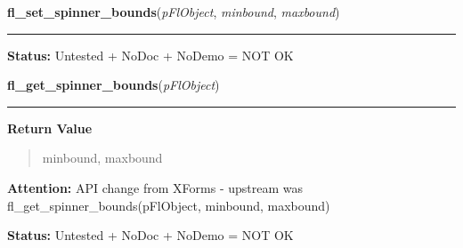     \label{xformslib:flspinner:fl_set_spinner_bounds}

    \vspace{0.5ex}

\hspace{.8\funcindent}\begin{boxedminipage}{\funcwidth}

    \raggedright \textbf{fl\_set\_spinner\_bounds}(\textit{pFlObject}, \textit{minbound}, \textit{maxbound})

    \vspace{-1.5ex}

    \rule{\textwidth}{0.5\fboxrule}
\setlength{\parskip}{2ex}
\setlength{\parskip}{1ex}
\textbf{Status:} Untested + NoDoc + NoDemo = NOT OK



    \end{boxedminipage}

    \label{xformslib:flspinner:fl_get_spinner_bounds}

    \vspace{0.5ex}

\hspace{.8\funcindent}\begin{boxedminipage}{\funcwidth}

    \raggedright \textbf{fl\_get\_spinner\_bounds}(\textit{pFlObject})

    \vspace{-1.5ex}

    \rule{\textwidth}{0.5\fboxrule}
\setlength{\parskip}{2ex}
\setlength{\parskip}{1ex}
      \textbf{Return Value}
    \vspace{-1ex}

      \begin{quote}
      minbound, maxbound

      \end{quote}

\textbf{Attention:} API change from XForms - upstream was fl\_get\_spinner\_bounds(pFlObject, 
minbound, maxbound)



\textbf{Status:} Untested + NoDoc + NoDemo = NOT OK



    \end{boxedminipage}

